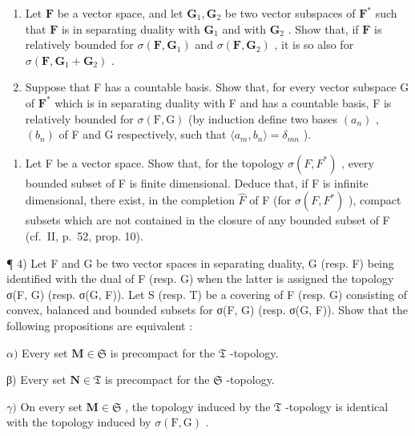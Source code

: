 \begin{enumerate}
\def\labelenumi{\alph{enumi})}
\setcounter{enumi}{1}
\item
  Let \(\mathbf{F}\) be a vector space, and let \(\mathbf{G}_1, \mathbf{G}_2\) be two vector subspaces of \(\mathbf{F}^*\) such that \(\mathbf{F}\) is in separating duality with \(\mathbf{G}_1\) and with \(\mathbf{G}_2\) . Show that, if \(\mathbf{F}\) is relatively bounded for \(\sigma(\mathbf{F}, \mathbf{G}_1)\) and \(\sigma(\mathbf{F}, \mathbf{G}_2)\) , it is so also for \(\sigma(\mathbf{F}, \mathbf{G}_1 + \mathbf{G}_2)\) .
\item
  Suppose that F has a countable basis. Show that, for every vector subspace G of \(\mathbf{F}^*\) which is in separating duality with F and has a countable basis, F is relatively bounded for \(\sigma(\mathrm{F},\mathrm{G})\) (by induction define two bases \((a_n)\) , \((b_n)\) of F and G respectively, such that \(\langle a_m, b_n \rangle = \delta_{mn}\) ).
\end{enumerate}

\begin{enumerate}
\def\labelenumi{\arabic{enumi})}
\setcounter{enumi}{2}
\tightlist
\item
  Let F be a vector space. Show that, for the topology \(\sigma(F, F^{*})\) , every bounded subset of F is finite dimensional. Deduce that, if F is infinite dimensional, there exist, in the completion \(\hat{F}\) of F (for \(\sigma(F, F^{*})\) ), compact subsets which are not contained in the closure of any bounded subset of F (cf.~II, p.~52, prop. 10).
\end{enumerate}

¶ 4) Let F and G be two vector spaces in separating duality, G (resp. F) being identified with the dual of F (resp. G) when the latter is assigned the topology σ(F, G) (resp. σ(G, F)). Let S (resp. T) be a covering of F (resp. G) consisting of convex, balanced and bounded subsets for σ(F, G) (resp. σ(G, F)). Show that the following propositions are equivalent :

\(\alpha)\) Every set \(\mathbf{M} \in \mathfrak{S}\) is precompact for the \(\mathfrak{T}\) -topology.

β) Every set \(\mathbf{N} \in \mathfrak{T}\) is precompact for the \(\mathfrak{S}\) -topology.

\(\gamma)\) On every set \(\mathbf{M} \in \mathfrak{S}\) , the topology induced by the \(\mathfrak{T}\) -topology is identical with the topology induced by \(\sigma(\mathrm{F}, \mathrm{G})\) .


